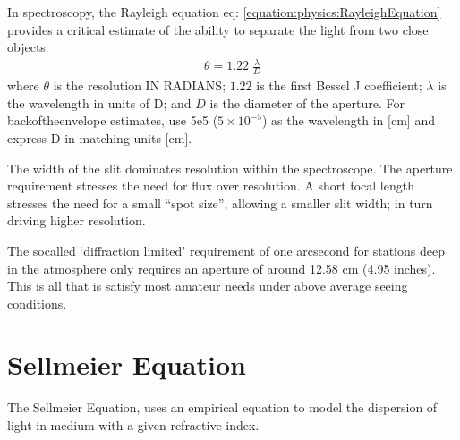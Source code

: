 \documentclass[letterpaper,10pt,english,openany,oneside]{sphinxmanual}
\begin{document}
\sphinxAtStartPar
In spectroscopy, the Rayleigh equation eq: \eqref{equation:physics:RayleighEquation} provides
a critical estimate of the ability to separate the light from two
close objects.
\begin{equation}\label{equation:physics:RayleighEquation}
\begin{split}\theta = 1.22\;\frac{\lambda}{D}\end{split}
\end{equation}
\sphinxAtStartPar
where \(\theta\) is the resolution IN RADIANS; \(1.22\) is the
first Bessel J coefficient; \(\lambda\) is the wavelength in units
of D; and \(D\) is the diameter of the aperture. For
back\sphinxhyphen{}of\sphinxhyphen{}the\sphinxhyphen{}envelope estimates, use 5e\sphinxhyphen{}5 (\(5\times 10^{-5}\)) as
the wavelength in {[}cm{]} and express D in matching units {[}cm{]}.

\sphinxAtStartPar
{} The width of the slit dominates resolution within the
spectroscope. The aperture requirement stresses the need for flux over
resolution. A short focal length stresses the need for a small “spot
size”, allowing a smaller slit width; in turn driving higher resolution.

\sphinxAtStartPar
The so\sphinxhyphen{}called ‘diffraction limited’ requirement of one arcsecond for
stations deep in the atmosphere only requires an aperture of around
12.58 cm (4.95 inches). This is all that is satisfy most amateur
needs under above average seeing conditions.


\section{Sellmeier Equation}
\label{\detokenize{physics:sellmeier-equation}}
\sphinxAtStartPar
The Sellmeier Equation, uses an empirical equation to model the
dispersion of light in medium with a given refractive index.
\end{document}
